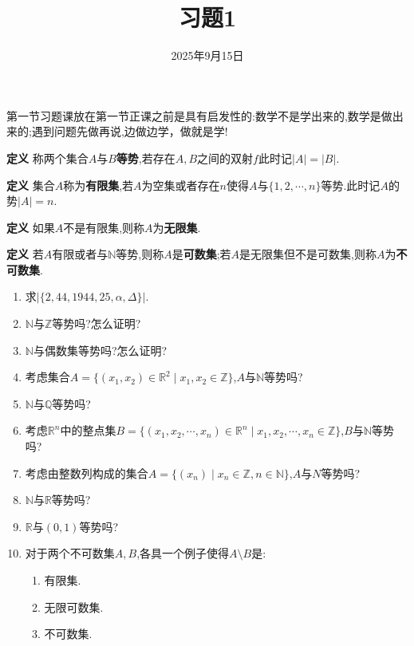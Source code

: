 \documentclass[
  a4paper,
]{ctexart}
\title{习题1}
\author{}
\date{2025年9月15日}
\providecommand{\tightlist}{\setlength{\itemsep}{0pt}\setlength{\parskip}{0pt}}
\begin{document}
%
\pagestyle{fancy}
\fancyhf{}


\renewcommand{\headrulewidth}{1pt}
\rfoot{\thepage}

第一节习题课放在第一节正课之前是具有启发性的:数学不是学出来的,数学是做出来的;遇到问题先做再说,边做边学，做就是学!

\textbf{定义}
称两个集合\(A\)与\(B\)\textbf{等势},若存在\(A,B\)之间的双射\(f\)此时记\(\vert A \rvert =  \vert B \rvert\).

\textbf{定义}
集合\(A\)称为\textbf{有限集},若\(A\)为空集或者存在\(n\)使得\(A\)与\(\{ 1,2,\cdots,n \}\)等势.此时记\(A\)的势\(\vert A \rvert = n\).

\textbf{定义} 如果\(A\)不是有限集,则称\(A\)为\textbf{无限集}.

\textbf{定义}
若\(A\)有限或者与\(\mathbb{N}\)等势,则称\(A\)是\textbf{可数集};若\(A\)是无限集但不是可数集,则称\(A\)为\textbf{不可数集}.

\begin{enumerate}
\def\labelenumi{\arabic{enumi}.}
\tightlist
\item
  求\(\vert \{ 2,44,1944,25,\alpha,\Delta \} \rvert\).
\item
  \(\mathbb{N}\)与\(\mathbb{Z}\)等势吗?怎么证明?
\item
  \(\mathbb{N}\)与偶数集等势吗?怎么证明?
\item
  考虑集合\(A=\{ \left( x_1,x_2 \right) \in \mathbb{R}^2 \mid x_1,x_2 \in \mathbb{Z} \}\),\(A\)与\(\mathbb{N}\)等势吗?
\item
  \(\mathbb{N}\)与\(\mathbb{Q}\)等势吗?
\item
  考虑\(\mathbb{R}^n\)中的整点集\(B=\{ \left( x_1,x_2,\cdots,x_n \right) \in \mathbb{R}^n \mid x_1,x_2,\cdots,x_n \in \mathbb{Z} \}\),\(B\)与\(\mathbb{N}\)等势吗?
\item
  考虑由整数列构成的集合\(A=\{ \left( x_n \right) \mid x_n \in \mathbb{Z} , n \in \mathbb{N} \}\),\(A\)与\(N\)等势吗?
\item
  \(\mathbb{N}\)与\(\mathbb{R}\)等势吗?
\item
  \(\mathbb{R}\)与\((0,1)\)等势吗?
\item
  对于两个不可数集\(A,B\),各具一个例子使得\(A \setminus B\)是:

  \begin{enumerate}
  \def\labelenumii{\arabic{enumii}.}
  \tightlist
  \item
    有限集.
  \item
    无限可数集.
  \item
    不可数集.
  \end{enumerate}
\end{enumerate}
\end{document}

